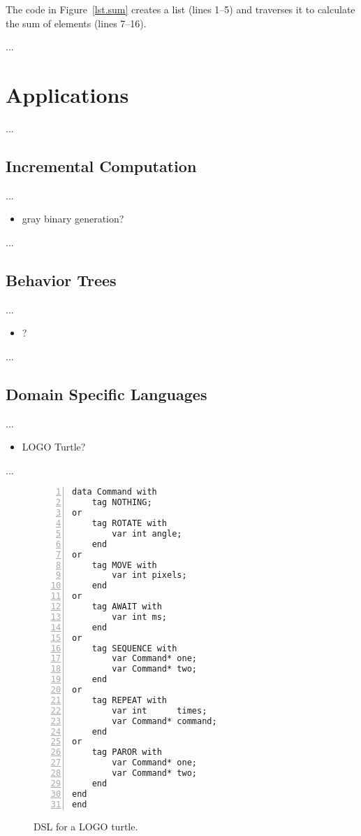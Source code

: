 \documentclass{acm_proc_article-sp}
\begin{document}
The code in Figure~\ref{lst.sum} creates a list (lines 1--5) and traverses it 
to calculate the sum of elements (lines 7--16).

...

\section{Applications}

...

\subsection{Incremental Computation}

...

\begin{itemize}
\item gray binary generation?
\end{itemize}

...

\subsection{Behavior Trees}

...

\begin{itemize}
\item ?
\end{itemize}

...

\subsection{Domain Specific Languages}

...

\begin{itemize}
\item LOGO Turtle?
\end{itemize}

...

\begin{figure}%
\begin{lstlisting}[numbers=left,xleftmargin=3em]
data Command with
    tag NOTHING;
or
    tag ROTATE with
        var int angle;
    end
or
    tag MOVE with
        var int pixels;
    end
or
    tag AWAIT with
        var int ms;
    end
or
    tag SEQUENCE with
        var Command* one;
        var Command* two;
    end
or
    tag REPEAT with
        var int      times;
        var Command* command;
    end
or
    tag PAROR with
        var Command* one;
        var Command* two;
    end
end
end
\end{lstlisting}
\caption{ DSL for a LOGO turtle.
\label{lst.turtle.dsl}
}
\end{figure}
\end{document}
